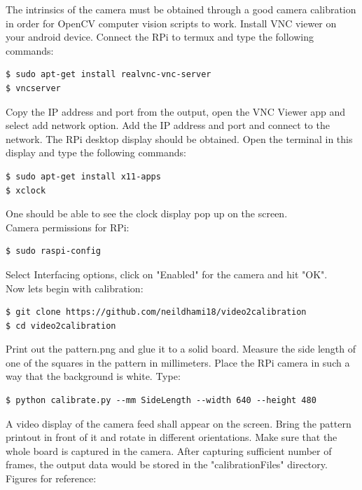 \documentclass{article}
\begin{document}
The intrinsics of the camera must be obtained through a good camera calibration in order for OpenCV computer vision scripts to work. Install VNC viewer on your android device.
Connect the RPi to termux and type the following commands:
\begin{lstlisting}
$ sudo apt-get install realvnc-vnc-server
$ vncserver
\end{lstlisting}
Copy the IP address and port from the output, open the VNC Viewer app and select add network option. Add the IP address and port and connect to the network. The RPi desktop display should be obtained. Open the terminal in this display and type the following commands:
\begin{lstlisting}
$ sudo apt-get install x11-apps
$ xclock
\end{lstlisting}
One should be able to see the clock display pop up on the screen.\\
Camera permissions for RPi:
\begin{lstlisting}
$ sudo raspi-config
\end{lstlisting}
Select Interfacing options, click on "Enabled" for the camera and hit "OK". \\
Now lets begin with calibration:
\begin{lstlisting}
$ git clone https://github.com/neildhami18/video2calibration
$ cd video2calibration
\end{lstlisting}
Print out the pattern.png and glue it to a solid board. Measure the side length of one of the squares in the pattern in millimeters. Place the RPi camera in such a way that the background is white. Type:
\begin{lstlisting}
$ python calibrate.py --mm SideLength --width 640 --height 480
\end{lstlisting}
A video display of the camera feed shall appear on the screen. Bring the pattern printout in front of it and rotate in different orientations. Make sure that the whole board is captured in the camera. After capturing sufficient number of frames, the output data would be stored in the "calibrationFiles" directory.
\\
Figures for reference:
\end{document}
